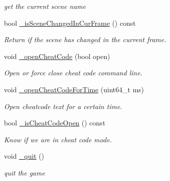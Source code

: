 \begin{DoxyCompactItemize}
\begin{DoxyCompactList}\small\item\em get the current scene name \end{DoxyCompactList}\item 
bool \hyperlink{class_scene_manager_a1bcdec59b83d98bce12e8e98649f19c9}{\+\_\+is\+Scene\+Changed\+In\+Cur\+Frame} () const
\begin{DoxyCompactList}\small\item\em Return if the scene has changed in the current frame. \end{DoxyCompactList}\item 
void \hyperlink{class_scene_manager_acae2f12e491a06191c50e0459b00b910}{\+\_\+open\+Cheat\+Code} (bool open)
\begin{DoxyCompactList}\small\item\em Open or force close cheat code command line. \end{DoxyCompactList}\item 
void \hyperlink{class_scene_manager_a5c09e7cb723f941b0fabcf1d97e6808d}{\+\_\+open\+Cheat\+Code\+For\+Time} (uint64\+\_\+t ms)
\begin{DoxyCompactList}\small\item\em Open cheatcode text for a certain time. \end{DoxyCompactList}\item 
bool \hyperlink{class_scene_manager_a2623c67be48d3a903c1638ff291674a9}{\+\_\+is\+Cheat\+Code\+Open} () const
\begin{DoxyCompactList}\small\item\em Know if we are in cheat code mode. \end{DoxyCompactList}\item 
\mbox{\label{class_scene_manager_a27cab997337709bba4545c24eaa845b1}} 
void \hyperlink{class_scene_manager_a27cab997337709bba4545c24eaa845b1}{\+\_\+quit} ()
\begin{DoxyCompactList}\small\item\em quit the game \end{DoxyCompactList}\end{DoxyCompactItemize}
